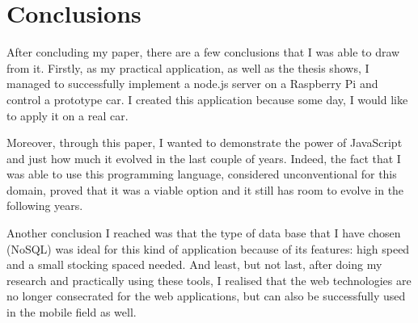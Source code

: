 
\chapter{Conclusions} %

\label{Chapter5} %



After concluding my paper, there are a few conclusions that I was able to draw from it. Firstly, as my practical application, as well as the thesis shows, I managed to successfully implement a node.js server on a Raspberry Pi and control a prototype car. I created this application because some day, I would like to apply it on a real car. 


Moreover, through this paper, I wanted to demonstrate the power of JavaScript and just how much it evolved in the last couple of years. Indeed, the fact that I was able to use this programming language, considered unconventional for this domain, proved that it was a viable option and it still has room to evolve in the following years. 


Another conclusion I reached was that the type of data base that I have chosen (NoSQL) was ideal for this kind of application because of its features: high speed and a small stocking spaced needed. And least, but not last, after doing my research and practically using these tools, I realised that the web technologies are no longer consecrated for the web applications, but can also be successfully used in the mobile field as well.